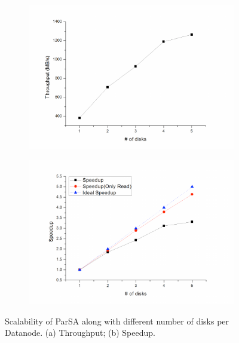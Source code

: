 \documentclass[preprint,12pt]{elsarticle}
\begin{document}
\begin{figure}[tbh]
    \centering
    \begin{subfigure}{0.5\textwidth}
        \includegraphics[width=\textwidth]{figure8a}
        \caption{}
        \label{figure8a}
    \end{subfigure}\begin{subfigure}{0.5\textwidth}
        \centering
        \includegraphics[width=\textwidth]{figure8b}%
        \caption{}
        \label{figure8b}
    \end{subfigure}
    \caption{Scalability of ParSA along with different number of disks per Datanode. (a) Throughput; (b) Speedup.}
    \label{figure8}
\end{figure}
\end{document}
